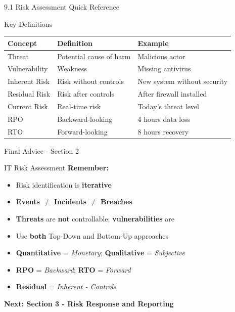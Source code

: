 \documentclass[9pt]{beamer}  %
\begin{document}
	\begin{frame}{9.1 Risk Assessment Quick Reference}
		\begin{block}{Key Definitions}
			\begin{tabular}{|p{3cm}|p{3.5cm}|p{3.5cm}|}
				\hline
				\textbf{Concept} & \textbf{Definition} & \textbf{Example} \\
				\hline
				Threat & Potential cause of harm & Malicious actor \\
				\hline
				Vulnerability & Weakness & Missing antivirus \\
				\hline
				Inherent Risk & Risk without controls & New system without security \\
				\hline
				Residual Risk & Risk after controls & After firewall installed \\
				\hline
				Current Risk & Real-time risk & Today's threat level \\
				\hline
				RPO & Backward-looking & 4 hours data loss \\
				\hline
				RTO & Forward-looking & 8 hours recovery \\
				\hline
			\end{tabular}
		\end{block}
	\end{frame}
	
	\begin{frame}{Final Advice - Section 2}
		\begin{block}{IT Risk Assessment}
			\centering
			\vspace{0.3cm}
			\textbf{Remember:}
			\begin{itemize}
				\item Risk identification is \textbf{iterative}
				\item \textbf{Events} $\ne$ \textbf{Incidents} $\ne$ \textbf{Breaches}
				\item \textbf{Threats} are \textbf{not} controllable; \textbf{vulnerabilities} are
				\item Use \textbf{both} Top-Down and Bottom-Up approaches
				\item \textbf{Quantitative} = \textit{Monetary}; \textbf{Qualitative} = \textit{Subjective}
				\item \textbf{RPO} = \textit{Backward}; \textbf{RTO} = \textit{Forward}
				\item \textbf{Residual} = \textit{Inherent - Controls}
			\end{itemize}
			\vspace{0.5cm}
			\textbf{Next: Section 3 - Risk Response and Reporting}
		\end{block}
	\end{frame}
	
	
\end{document}
